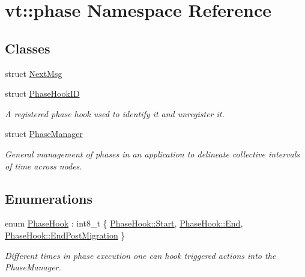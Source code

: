 \hypertarget{namespacevt_1_1phase}{}\section{vt\+:\+:phase Namespace Reference}
\label{namespacevt_1_1phase}
\subsection*{Classes}
\begin{DoxyCompactItemize}
\item 
struct \hyperlink{structvt_1_1phase_1_1_next_msg}{Next\+Msg}
\item 
struct \hyperlink{structvt_1_1phase_1_1_phase_hook_i_d}{Phase\+Hook\+ID}
\begin{DoxyCompactList}\small\item\em A registered phase hook used to identify it and unregister it. \end{DoxyCompactList}\item 
struct \hyperlink{structvt_1_1phase_1_1_phase_manager}{Phase\+Manager}
\begin{DoxyCompactList}\small\item\em General management of phases in an application to delineate collective intervals of time across nodes. \end{DoxyCompactList}\end{DoxyCompactItemize}
\subsection*{Enumerations}
\begin{DoxyCompactItemize}
\item 
enum \hyperlink{namespacevt_1_1phase_aec9a63fdd99680d7a7fe99d321193811}{Phase\+Hook} \+: int8\+\_\+t \{ \hyperlink{namespacevt_1_1phase_aec9a63fdd99680d7a7fe99d321193811aa6122a65eaa676f700ae68d393054a37}{Phase\+Hook\+::\+Start}, 
\hyperlink{namespacevt_1_1phase_aec9a63fdd99680d7a7fe99d321193811a87557f11575c0ad78e4e28abedc13b6e}{Phase\+Hook\+::\+End}, 
\hyperlink{namespacevt_1_1phase_aec9a63fdd99680d7a7fe99d321193811a92bbcee517f28808f9795872094c0f08}{Phase\+Hook\+::\+End\+Post\+Migration}
 \}\begin{DoxyCompactList}\small\item\em Different times in phase execution one can hook triggered actions into the {\ttfamily Phase\+Manager}. \end{DoxyCompactList}
\end{DoxyCompactItemize}


